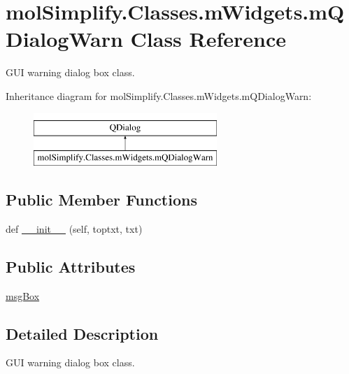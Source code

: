 \hypertarget{classmolSimplify_1_1Classes_1_1mWidgets_1_1mQDialogWarn}{}\section{mol\+Simplify.\+Classes.\+m\+Widgets.\+m\+Q\+Dialog\+Warn Class Reference}
\label{classmolSimplify_1_1Classes_1_1mWidgets_1_1mQDialogWarn}


G\+UI warning dialog box class.  


Inheritance diagram for mol\+Simplify.\+Classes.\+m\+Widgets.\+m\+Q\+Dialog\+Warn\+:\begin{figure}[H]
\begin{center}
\leavevmode
\includegraphics[height=2.000000cm]{classmolSimplify_1_1Classes_1_1mWidgets_1_1mQDialogWarn}
\end{center}
\end{figure}
\subsection*{Public Member Functions}
\begin{DoxyCompactItemize}
\item 
def \hyperlink{classmolSimplify_1_1Classes_1_1mWidgets_1_1mQDialogWarn_a2f01dd2838544bad680c22949810207a}{\+\_\+\+\_\+init\+\_\+\+\_\+} (self, toptxt, txt)
\end{DoxyCompactItemize}
\subsection*{Public Attributes}
\begin{DoxyCompactItemize}
\item 
\hyperlink{classmolSimplify_1_1Classes_1_1mWidgets_1_1mQDialogWarn_a70da02558109736f726fe3945081d0cd}{msg\+Box}
\end{DoxyCompactItemize}


\subsection{Detailed Description}
G\+UI warning dialog box class. 

